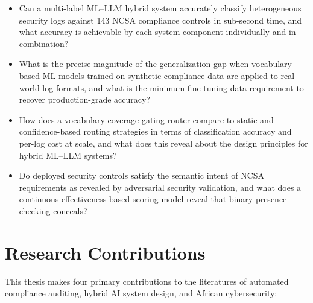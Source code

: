 \documentclass[12pt,oneside]{report}
\begin{document}
\begin{itemize}
  \item[\textbf{RQ1}] Can a multi-label ML--LLM hybrid system accurately classify heterogeneous security logs against 143 NCSA compliance controls in sub-second time, and what accuracy is achievable by each system component individually and in combination?
  \item[\textbf{RQ2}] What is the precise magnitude of the generalization gap when vocabulary-based ML models trained on synthetic compliance data are applied to real-world log formats, and what is the minimum fine-tuning data requirement to recover production-grade accuracy?
  \item[\textbf{RQ3}] How does a vocabulary-coverage gating router compare to static and confidence-based routing strategies in terms of classification accuracy and per-log cost at scale, and what does this reveal about the design principles for hybrid ML--LLM systems?
  \item[\textbf{RQ4}] Do deployed security controls satisfy the semantic intent of NCSA requirements as revealed by adversarial security validation, and what does a continuous effectiveness-based scoring model reveal that binary presence checking conceals?
\end{itemize}

\section{Research Contributions}

This thesis makes four primary contributions to the literatures of automated compliance auditing, hybrid AI system design, and African cybersecurity:
\end{document}
